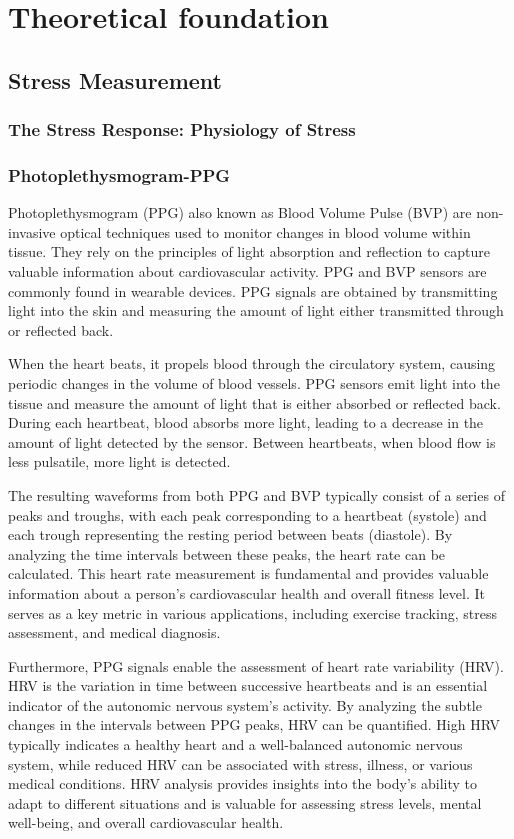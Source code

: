 \chapter{Theoretical foundation}

\section{Stress Measurement}
\subsection{The Stress Response: Physiology of Stress}
\subsection{Photoplethysmogram-PPG}

Photoplethysmogram (PPG) also known as  Blood Volume Pulse (BVP) are non-invasive optical techniques used to monitor changes in blood volume within tissue. They rely on the principles of light absorption and reflection to capture valuable information about cardiovascular activity. PPG and BVP sensors are commonly found in wearable devices. PPG signals are obtained by transmitting light into the skin and measuring the amount of light either transmitted through or reflected back. 

When the heart beats, it propels blood through the circulatory system, causing periodic changes in the volume of blood vessels. PPG sensors emit light into the tissue and measure the amount of light that is either absorbed or reflected back. During each heartbeat, blood absorbs more light, leading to a decrease in the amount of light detected by the sensor. Between heartbeats, when blood flow is less pulsatile, more light is detected.

The resulting waveforms from both PPG and BVP typically consist of a series of peaks and troughs, with each peak corresponding to a heartbeat (systole) and each trough representing the resting period between beats (diastole). By analyzing the time intervals between these peaks, the heart rate can be calculated. This heart rate measurement is fundamental and provides valuable information about a person's cardiovascular health and overall fitness level. It serves as a key metric in various applications, including exercise tracking, stress assessment, and medical diagnosis.

Furthermore, PPG signals enable the assessment of heart rate variability (HRV). HRV is the variation in time between successive heartbeats and is an essential indicator of the autonomic nervous system's activity. By analyzing the subtle changes in the intervals between PPG peaks, HRV can be quantified. High HRV typically indicates a healthy heart and a well-balanced autonomic nervous system, while reduced HRV can be associated with stress, illness, or various medical conditions. HRV analysis provides insights into the body's ability to adapt to different situations and is valuable for assessing stress levels, mental well-being, and overall cardiovascular health.

